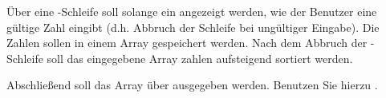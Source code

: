 %
\par Über eine -Schleife soll solange ein  angezeigt
werden, wie der Benutzer eine gültige Zahl eingibt (d.h. Abbruch der Schleife
bei ungültiger Eingabe). Die Zahlen sollen in einem Array 
gespeichert werden. Nach dem Abbruch der -Schleife soll das
eingegebene Array zahlen aufsteigend sortiert werden.
%
\par Abschließend soll das Array über  ausgegeben werden. Benutzen
Sie hierzu .